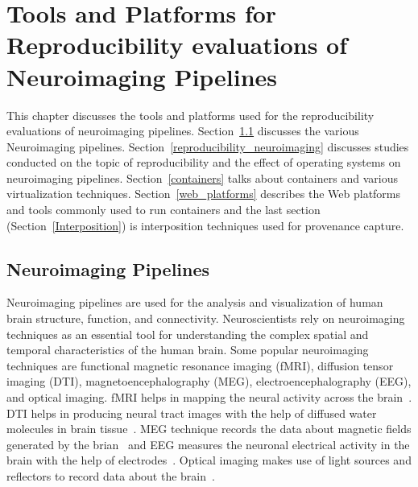 \chapter{Tools and Platforms for Reproducibility evaluations of Neuroimaging Pipelines}\label{toolsandplatforms}

This chapter discusses the tools and platforms used for the reproducibility evaluations of neuroimaging pipelines.
Section~\ref{neuroimaging} discusses the various Neuroimaging pipelines. Section~\ref{reproducibility_neuroimaging} discusses studies conducted on the topic of reproducibility and the effect of operating systems on neuroimaging pipelines. Section~\ref{containers} talks about containers and various virtualization techniques. Section~\ref{web_platforms} describes the Web platforms and tools commonly used to run containers and the last section (Section~\ref{Interposition}) is interposition techniques used for provenance capture.

\section{Neuroimaging Pipelines}\label{neuroimaging}
Neuroimaging pipelines are used for the analysis and visualization of human brain structure, function, and connectivity. Neuroscientists rely on neuroimaging techniques as an essential tool for understanding the complex spatial and temporal characteristics of the human brain. Some popular neuroimaging techniques are functional magnetic resonance imaging (fMRI), diffusion tensor imaging (DTI), magnetoencephalography (MEG), electroencephalography (EEG), and optical imaging. fMRI helps in mapping the neural activity across the brain~\cite{BUCHBINDER201661}. DTI helps in producing neural tract images with the help of diffused water molecules in brain tissue~\cite{Rizea11}. MEG technique records the data about magnetic fields generated by the brian~\cite{Sato1985} and EEG measures the neuronal electrical activity in the brain with the help of electrodes~\cite{Light2010}. Optical imaging makes use of light sources and reflectors to record data about the brain~\cite{doi:10.1080/23273798.2017.1290810}.

